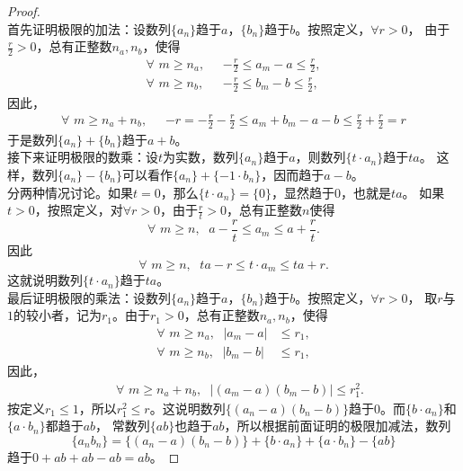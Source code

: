\documentclass[12pt,UTF8,fontset=none]{ctexbook}
\begin{document}
\begin{proof}
    \mbox{} \\
    首先证明极限的加法：设数列$\{a_n\}$趋于$a$，$\{b_n\}$趋于$b$。按照定义，$\forall r > 0$，
    由于$\frac{r}{2}>0$，总有正整数$n_a, n_b$，使得
    \begin{align*}
        \forall \,\, m \geqslant n_a, \;\,\, & - \frac{r}{2} \leqslant a_m - a \leqslant \frac{r}{2},  \\
        \forall \,\, m \geqslant n_b, \;\,\, & - \frac{r}{2} \leqslant b_m - b \leqslant \frac{r}{2},  
    \end{align*}
    因此，
    \begin{align*}
        \forall \,\, m \geqslant n_a + n_b, \;\,\, & -r = - \frac{r}{2} - \frac{r}{2} \leqslant a_m + b_m - a - b \leqslant \frac{r}{2} + \frac{r}{2} = r  
    \end{align*}
    于是数列$\{a_n\} + \{b_n\}$趋于$a + b$。\\
    接下来证明极限的数乘：设$t$为实数，数列$\{a_n\}$趋于$a$，则数列$\{t\cdot a_n\}$趋于$ta$。
    这样，数列$\{a_n\} - \{b_n\}$可以看作$\{a_n\} + \{-1\cdot b_n\}$，因而趋于$a - b$。\\
    分两种情况讨论。如果$t=0$，那么$\{t\cdot a_n\} = \{0\}$，显然趋于$0$，也就是$ta$。
    如果$t > 0$，按照定义，对$\forall r > 0$，由于$\frac{r}{t} > 0$，总有正整数$n$使得
    $$ \forall \,\, m \geqslant n, \;\,\, a - \frac{r}{t} \leqslant a_m \leqslant a + \frac{r}{t}. $$
    因此
    $$ \forall \,\, m \geqslant n, \;\,\, ta - r \leqslant t\cdot a_m \leqslant ta + r. $$
    这就说明数列$\{t\cdot a_n\}$趋于$ta$。\\
    最后证明极限的乘法：设数列$\{a_n\}$趋于$a$，$\{b_n\}$趋于$b$。按照定义，$\forall r > 0$，
    取$r$与$1$的较小者，记为$r_1$。由于$r_1>0$，总有正整数$n_a, n_b$，使得
    \begin{align*}
        \forall \,\, m \geqslant n_a, \;\,\, |a_m - a| & \leqslant r_1,  \\
        \forall \,\, m \geqslant n_b, \;\,\, | b_m - b| & \leqslant r_1,  
    \end{align*}
    因此，
    \begin{align*}
        \mbox{}\quad\forall \,\, m \geqslant n_a + n_b, \;\,\, |(a_m - a)(b_m - b) | \leqslant r_1^2.  
    \end{align*}
    按定义$r_1\leqslant 1$，所以$r_1^2 \leqslant r$。这说明数列$\{(a_n - a)(b_n - b)\}$趋于$0$。而$\{b\cdot a_n\}$和$\{a \cdot b_n\}$都趋于$ab$，
    常数列$\{ab\}$也趋于$ab$，所以根据前面证明的极限加减法，数列
    $$\{a_nb_n\} = \{(a_n - a)(b_n - b)\} + \{b\cdot a_n\} + \{a \cdot b_n\} - \{ab\}$$
    趋于$0 + ab + ab - ab = ab$。
\end{proof}
\end{document}
